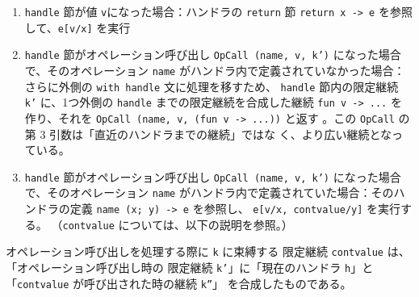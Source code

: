 \begin{enumerate}
\item \texttt{handle} 節が値 \texttt{v}になった場合：ハンドラの \texttt{return} 節 \texttt{return x -> e} を参照して、\texttt{e[v/x]} を実行
\item \texttt{handle} 節がオペレーション呼び出し \texttt{OpCall (name, v, k')} になった場合で、そのオペレーション \texttt{name} がハンドラ内で定義されていなかった場合：
さらに外側の \texttt{with handle} 文に処理を移すため、
\texttt{handle} 節内の限定継続 \texttt{k'} に、1つ外側の \texttt{handle} までの限定継続を合成した継続 \texttt{fun v -> ...} を作り、それを \texttt{OpCall (name, v, (fun v -> ...))} と返す
。この \texttt{OpCall} の第 3 引数は「直近のハンドラまでの継続」ではな
く、より広い継続となっている。
\item \texttt{handle} 節がオペレーション呼び出し \texttt{OpCall (name, v, k')} になった場合で、そのオペレーション \texttt{name} がハンドラ内で定義されていた場合：そのハンドラの定義 \texttt{name (x; y) -> e} を参照し、
\texttt{e[v/x, cont\US value/y]} を実行する。
（\texttt{cont\US value} については、以下の説明を参照。）
\end{enumerate}

オペレーション呼び出しを処理する際に \texttt{k} に束縛する
限定継続 \texttt{cont\US value} は、「オペレーション呼び出し時の
限定継続 \texttt{k'}」に「現在のハンドラ \texttt{h}」と
「\texttt{cont\US value} が呼び出された時の継続 \texttt{k''}」
を合成したものである。

